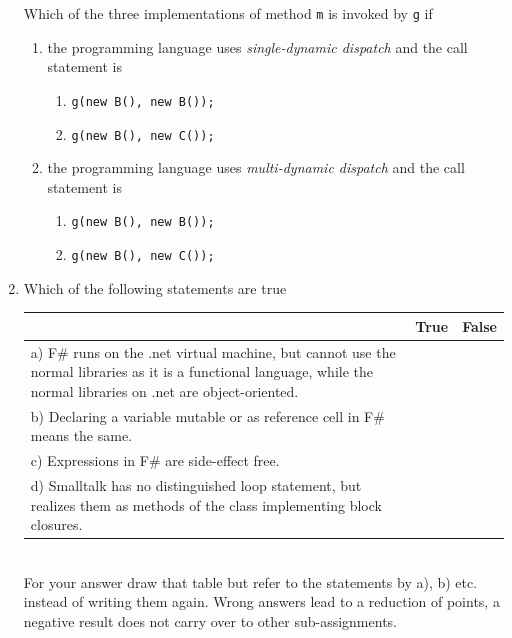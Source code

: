 \documentclass{article}
\begin{document}
\begin{enumerate}
Which of the three implementations of method \lstinline!m! is invoked by
\lstinline!g! if
\begin{enumerate}
\item the programming language uses \emph{single-dynamic dispatch} and
  the call statement is
 \begin{enumerate}
    \item \lstinline!g(new B(), new B());!
    \item \lstinline!g(new B(), new C());!
  \end{enumerate}
  \item the programming language uses \emph{multi-dynamic dispatch}
    and the call statement is
 \begin{enumerate}
    \item \lstinline!g(new B(), new B());!
    \item \lstinline!g(new B(), new C());!
    \end{enumerate}
\end{enumerate}
\item Which of the following statements are true\\
    \begin{tabular}{|p{6cm}|c|c|}\hline
      & True & False \\ \hline
      a) F\# runs on the \textsf{.net} virtual machine, but cannot use the
      normal libraries as it is a functional language, while the normal
      libraries on \textsf{.net} are object-oriented. & & \\\hline
      b) Declaring a variable mutable or as reference cell in F\# means
      the same. & & \\\hline
      c) Expressions in F\# are side-effect free. & & \\\hline
      d) Smalltalk has no distinguished loop statement, but realizes
      them as methods of the class implementing block closures.  & & \\\hline
   \end{tabular}\\
   For your answer draw that table but refer to the statements by a),
   b) etc. instead of writing them again. Wrong answers lead to a
   reduction of points, a negative result does not carry over to other
   sub-assignments. 
\end{enumerate}
\end{document}
